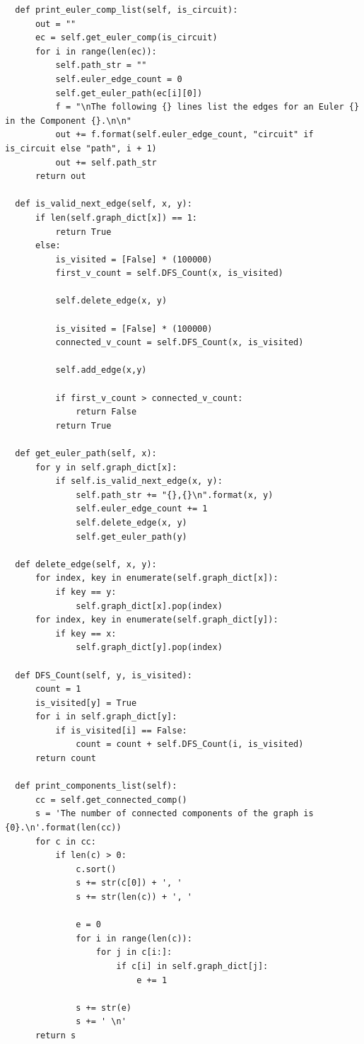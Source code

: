 \documentclass{article}
\begin{document}
\begin{enumerate}
\begin{enumerate}
\begin{lstlisting}
  def print_euler_comp_list(self, is_circuit):
      out = ""
      ec = self.get_euler_comp(is_circuit)  
      for i in range(len(ec)):
          self.path_str = ""
          self.euler_edge_count = 0
          self.get_euler_path(ec[i][0])
          f = "\nThe following {} lines list the edges for an Euler {} in the Component {}.\n\n"            
          out += f.format(self.euler_edge_count, "circuit" if is_circuit else "path", i + 1)
          out += self.path_str
      return out
              
  def is_valid_next_edge(self, x, y): 
      if len(self.graph_dict[x]) == 1: 
          return True
      else:   
          is_visited = [False] * (100000) 
          first_v_count = self.DFS_Count(x, is_visited) 
          
          self.delete_edge(x, y)

          is_visited = [False] * (100000) 
          connected_v_count = self.DFS_Count(x, is_visited) 

          self.add_edge(x,y) 

          if first_v_count > connected_v_count:
              return False
          return True

  def get_euler_path(self, x):
      for y in self.graph_dict[x]: 
          if self.is_valid_next_edge(x, y): 
              self.path_str += "{},{}\n".format(x, y)
              self.euler_edge_count += 1
              self.delete_edge(x, y) 
              self.get_euler_path(y)
              
  def delete_edge(self, x, y): 
      for index, key in enumerate(self.graph_dict[x]): 
          if key == y: 
              self.graph_dict[x].pop(index) 
      for index, key in enumerate(self.graph_dict[y]): 
          if key == x: 
              self.graph_dict[y].pop(index) 
              
  def DFS_Count(self, y, is_visited): 
      count = 1
      is_visited[y] = True
      for i in self.graph_dict[y]:
          if is_visited[i] == False: 
              count = count + self.DFS_Count(i, is_visited)          
      return count              
  
  def print_components_list(self):
      cc = self.get_connected_comp()        
      s = 'The number of connected components of the graph is {0}.\n'.format(len(cc))
      for c in cc:
          if len(c) > 0:
              c.sort()
              s += str(c[0]) + ', '
              s += str(len(c)) + ', '
              
              e = 0
              for i in range(len(c)):
                  for j in c[i:]:
                      if c[i] in self.graph_dict[j]:
                          e += 1
                          
              s += str(e)
              s += ' \n'
      return s      
    \end{lstlisting}
  \end{enumerate}

  

  \end{enumerate}  %
\end{document}
